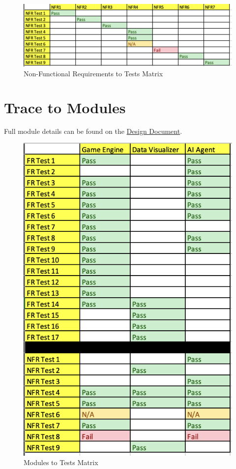 \documentclass[12pt, titlepage]{article}
\begin{document}
\begin{figure}[!ht]
    \centering
    \includegraphics[width=\textwidth]{NFR.png}
    \caption{Non-Functional Requirements to Tests Matrix}
    \label{Non-Functional Requirements to Tests Matrix}
\end{figure}

\clearpage
\section{Trace to Modules}		
Full module details can be found on the \href{https://github.com/Dorps/aiboardgame/blob/main/docs/Design/Design.pdf}{Design Document}. 
\begin{figure}[!ht]
    \centering
    \includegraphics{MG.png}
    \caption{Modules to Tests Matrix}
    \label{Modules to Tests Matrix}
\end{figure}
\end{document}
